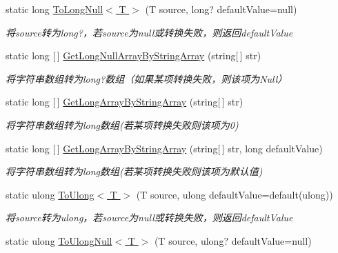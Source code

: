 \begin{DoxyCompactItemize}
static long \hyperlink{class_x_c_l_net_tools_1_1_common_1_1_data_type_convert_aab1df041cd20aff895e52b356c534a56}{To\+Long\+Null$<$ T $>$} (T source, long? default\+Value=null)
\begin{DoxyCompactList}\small\item\em 将source转为long?，若source为null或转换失败，则返回default\+Value \end{DoxyCompactList}\item 
static long \mbox{[}$\,$\mbox{]} \hyperlink{class_x_c_l_net_tools_1_1_common_1_1_data_type_convert_a67fc25be608a1e2f701e986b25bb5821}{Get\+Long\+Null\+Array\+By\+String\+Array} (string\mbox{[}$\,$\mbox{]} str)
\begin{DoxyCompactList}\small\item\em 将字符串数组转为long?数组（如果某项转换失败，则该项为\+Null） \end{DoxyCompactList}\item 
static long \mbox{[}$\,$\mbox{]} \hyperlink{class_x_c_l_net_tools_1_1_common_1_1_data_type_convert_ab6f926a9f94557017048ab3f8e4888ea}{Get\+Long\+Array\+By\+String\+Array} (string\mbox{[}$\,$\mbox{]} str)
\begin{DoxyCompactList}\small\item\em 将字符串数组转为long数组(若某项转换失败则该项为0) \end{DoxyCompactList}\item 
static long \mbox{[}$\,$\mbox{]} \hyperlink{class_x_c_l_net_tools_1_1_common_1_1_data_type_convert_ad786581f0cbd2158d4f345104b15d487}{Get\+Long\+Array\+By\+String\+Array} (string\mbox{[}$\,$\mbox{]} str, long default\+Value)
\begin{DoxyCompactList}\small\item\em 将字符串数组转为long数组(若某项转换失败则该项为默认值) \end{DoxyCompactList}\item 
static ulong \hyperlink{class_x_c_l_net_tools_1_1_common_1_1_data_type_convert_ab4e2db26e84855a2f64cdde1e683e5bc}{To\+Ulong$<$ T $>$} (T source, ulong default\+Value=default(ulong))
\begin{DoxyCompactList}\small\item\em 将source转为ulong，若source为null或转换失败，则返回default\+Value \end{DoxyCompactList}\item 
static ulong \hyperlink{class_x_c_l_net_tools_1_1_common_1_1_data_type_convert_a7f6000442f319f5f29c38a53cac6f69a}{To\+Ulong\+Null$<$ T $>$} (T source, ulong? default\+Value=null)

\end{DoxyCompactItemize}
